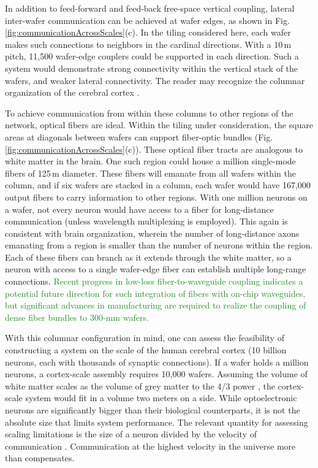 \documentclass[twocolumn]{article}
\begin{document}
In addition to feed-forward and feed-back free-space vertical coupling, lateral inter-wafer communication can be achieved at wafer edges, as shown in Fig.\,\ref{fig:communicationAcrossScales}(c). In the tiling considered here, each wafer makes such connections to neighbors in the cardinal directions. With a 10\,\textmu m pitch, 11,500 wafer-edge couplers could be supported in each direction. Such a system would demonstrate strong connectivity within the vertical stack of the wafers, and weaker lateral connectivity. The reader may recognize the columnar organization of the cerebral cortex \cite{mo1997}.

To achieve communication from within these columns to other regions of the network, optical fibers are ideal. Within the tiling under consideration, the square areas at diagonals between wafers can support fiber-optic bundles (Fig.\,\ref{fig:communicationAcrossScales}(c)). These optical fiber tracts are analogous to white matter in the brain. One such region could house a million single-mode fibers of 125\,\textmu m diameter. These fibers will emanate from all wafers within the column, and if six wafers are stacked in a column, each wafer would have 167,000 output fibers to carry information to other regions. With one million neurons on a wafer, not every neuron would have access to a fiber for long-distance communication (unless wavelength multiplexing is employed). This again is consistent with brain organization, wherein the number of long-distance axons emanating from a region is smaller than the number of neurons within the region. Each of these fibers can branch as it extends through the white matter, so a neuron with access to a single wafer-edge fiber can establish multiple long-range connections. \textcolor{ForestGreen}{Recent progress in low-loss fiber-to-waveguide coupling \cite{khbu2020} indicates a potential future direction for such integration of fibers with on-chip waveguides, but significant advances in manufacturing are required to realize the coupling of dense fiber bundles to 300-mm wafers.}

With this columnar configuration in mind, one can assess the feasibility of constructing a system on the scale of the human cerebral cortex (10 billion neurons, each with thousands of synaptic connections). If a wafer holds a million neurons, a cortex-scale assembly requires 10,000 wafers. Assuming the volume of white matter scales as the volume of grey matter to the 4/3 power \cite{zhse2000}, the cortex-scale system would fit in a volume two meters on a side. While optoelectronic neurons are significantly bigger than their biological counterparts, it is not the absolute size that limits system performance. The relevant quantity for assessing scaling limitations is the size of a neuron divided by the velocity of communication \cite{sh2019}. Communication at the highest velocity in the universe more than compensates. 
\end{document}
